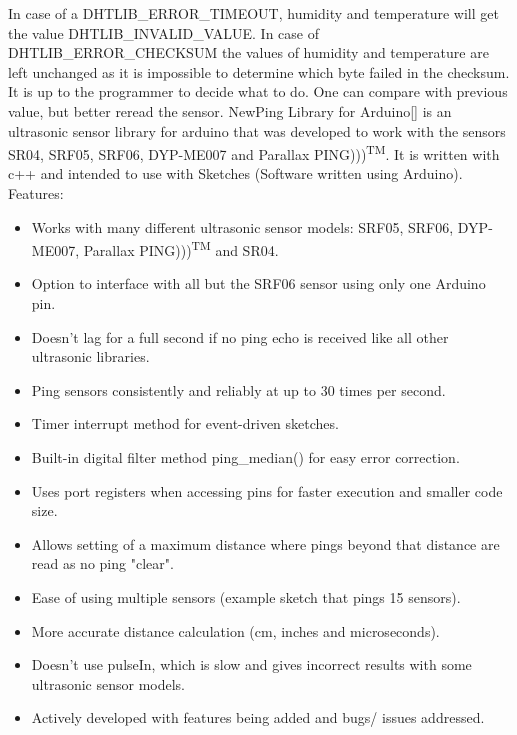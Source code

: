\documentclass{acm_proc_article-sp}
\begin{document}
In case of a DHTLIB\_ERROR\_TIMEOUT, humidity and temperature will get the value DHTLIB\_INVALID\_VALUE. In case of DHTLIB\_ERROR\_CHECKSUM the values of humidity and temperature are left unchanged as it is impossible to determine which byte failed in the checksum. It is up to the programmer to decide what to do. One can compare with previous value, but better reread the sensor.
\newline
\newline
NewPing Library for Arduino[] is an ultrasonic sensor library for arduino that was developed to work with the sensors SR04, SRF05, SRF06, DYP-ME007 and Parallax PING)))\textsuperscript{TM}. It is written with c++ and intended to use with Sketches (Software written using Arduino). 
\newline
\newline
Features:
\begin{itemize}
\item Works with many different ultrasonic sensor models: SRF05, SRF06, DYP-ME007, Parallax PING)))\textsuperscript{TM} and SR04.
\item Option to interface with all but the SRF06 sensor using only one Arduino pin.
\item Doesn't lag for a full second if no ping echo is received like all other ultrasonic libraries.
\item Ping sensors consistently and reliably at up to 30 times per second.
\item Timer interrupt method for event-driven sketches.
\item Built-in digital filter method ping\_median() for easy error correction.
\item Uses port registers when accessing pins for faster execution and smaller code size.
\item Allows setting of a maximum distance where pings beyond that distance are read as no ping "clear".
\item Ease of using multiple sensors (example sketch that pings 15 sensors).
\item More accurate distance calculation (cm, inches and microseconds).
\item Doesn't use pulseIn, which is slow and gives incorrect results with some ultrasonic sensor models.
\item Actively developed with features being added and bugs/ issues addressed. 
\end{itemize}
\end{document}
